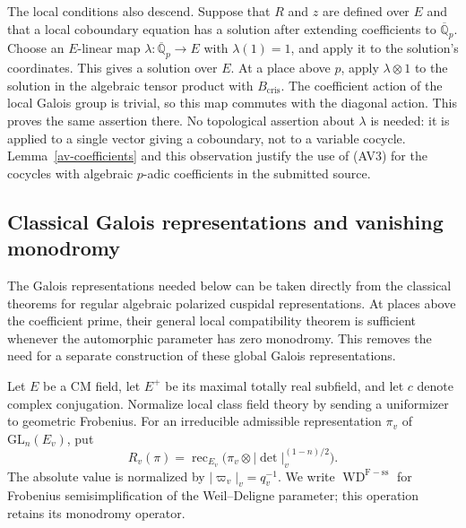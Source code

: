 The local conditions also descend. Suppose that $R$ and $z$
are defined over $E$ and that a local coboundary equation has
a solution after extending coefficients to
$\overline{\mathbb Q}_p$. Choose an $E$-linear map
$\lambda:\overline{\mathbb Q}_p\longrightarrow E$ with
$\lambda(1)=1$, and apply it to the solution's coordinates.
This gives a solution over $E$. At a place above $p$, apply
$\lambda\otimes1$ to the solution in the algebraic tensor
product with $B_{\mathrm{cris}}$. The coefficient action of
the local Galois group is trivial, so this map commutes with
the diagonal action. This proves the same assertion there.
No topological assertion about $\lambda$ is needed: it is
applied to a single vector giving a coboundary, not to a
variable cocycle. Lemma~\ref{av-coefficients} and this observation
justify the use of (AV3) for the cocycles with algebraic
$p$-adic coefficients in the submitted source.

\subsection{Classical Galois representations and vanishing monodromy}
\label{sec-classical-galois}

The Galois representations needed below can be taken directly from
the classical theorems for regular algebraic polarized cuspidal
representations. At places above the coefficient prime, their general
local compatibility theorem is sufficient whenever the automorphic
parameter has zero monodromy. This removes the need for a separate
construction of these global Galois representations.

Let $E$ be a CM field, let $E^+$ be its maximal totally real
subfield, and let $c$ denote complex conjugation. Normalize local
class field theory by sending a uniformizer to geometric Frobenius.
For an irreducible admissible representation $\pi_v$ of
$\mathrm{GL}_n(E_v)$, put
\[
 R_v(\pi)=\operatorname{rec}_{E_v}
       \bigl(\pi_v\otimes|\det|_v^{(1-n)/2}\bigr).
\]
The absolute value is normalized by $|\varpi_v|_v=q_v^{-1}$.
We write $\operatorname{WD}^{\mathrm{F\!\!-ss}}$ for Frobenius
semisimplification of the Weil--Deligne parameter; this operation
retains its monodromy operator.

